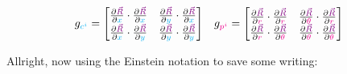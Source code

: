 \begin{align*}
    g_{\color{cyan}c^i} = \begin{bmatrix}
        \frac{\partial \begingroup\color{violet}\vec{R}\endgroup}{\partial \begingroup\color{cyan}x\endgroup} \cdot \frac{\partial \begingroup\color{violet}\vec{R}\endgroup}{\partial \begingroup\color{cyan}x\endgroup} & \frac{\partial \begingroup\color{violet}\vec{R}\endgroup}{\partial \begingroup\color{cyan}y\endgroup} \cdot \frac{\partial \begingroup\color{violet}\vec{R}\endgroup}{\partial \begingroup\color{cyan}x\endgroup}\\
        \frac{\partial \begingroup\color{violet}\vec{R}\endgroup}{\partial \begingroup\color{cyan}x\endgroup} \cdot \frac{\partial \begingroup\color{violet}\vec{R}\endgroup}{\partial \begingroup\color{cyan}y\endgroup} & \frac{\partial \begingroup\color{violet}\vec{R}\endgroup}{\partial \begingroup\color{cyan}y\endgroup} \cdot \frac{\partial \begingroup\color{violet}\vec{R}\endgroup}{\partial \begingroup\color{cyan}y\endgroup}
    \end{bmatrix} &&
    g_{\color{magenta}p^i} = \begin{bmatrix}
        \frac{\partial \begingroup\color{violet}\vec{R}\endgroup}{\partial \begingroup\color{magenta}r\endgroup} \cdot \frac{\partial \begingroup\color{violet}\vec{R}\endgroup}{\partial \begingroup\color{magenta}r\endgroup} & \frac{\partial \begingroup\color{violet}\vec{R}\endgroup}{\partial \begingroup\color{magenta}\theta\endgroup} \cdot \frac{\partial \begingroup\color{violet}\vec{R}\endgroup}{\partial \begingroup\color{magenta}r\endgroup}\\
        \frac{\partial \begingroup\color{violet}\vec{R}\endgroup}{\partial \begingroup\color{magenta}r\endgroup} \cdot \frac{\partial \begingroup\color{violet}\vec{R}\endgroup}{\partial \begingroup\color{magenta}\theta\endgroup} & \frac{\partial \begingroup\color{violet}\vec{R}\endgroup}{\partial \begingroup\color{magenta}\theta\endgroup} \cdot \frac{\partial \begingroup\color{violet}\vec{R}\endgroup}{\partial \begingroup\color{magenta}\theta\endgroup}
    \end{bmatrix}
\end{align*}

Allright, now using the Einstein notation to save some writing:

